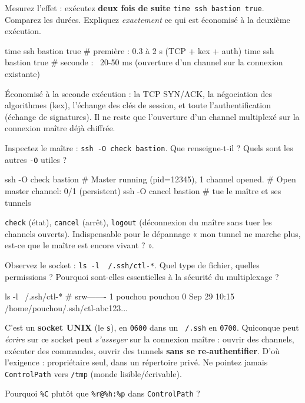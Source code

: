 \documentclass[a4paper,10pt]{exam}
\begin{document}
\begin{questions}
\question Mesurez l'effet : exécutez \textbf{deux fois de suite}
\texttt{time ssh bastion true}. Comparez les durées. Expliquez \emph{exactement} ce qui
est économisé à la deuxième exécution.
\begin{solution}
\begin{bashcode}
time ssh bastion true
# première : 0.3 à 2 s (TCP + kex + auth)
time ssh bastion true
# seconde : ~20-50 ms (ouverture d'un channel sur la connexion existante)
\end{bashcode}
Économisé à la seconde exécution : la TCP SYN/ACK, la négociation des algorithmes
(kex), l'échange des clés de session, et toute l'authentification (échange de
signatures). Il ne reste que l'ouverture d'un channel multiplexé sur la connexion
maître déjà chiffrée.
\end{solution}
\question Inspectez le maître : \texttt{ssh -O check bastion}. Que renseigne-t-il ?
Quels sont les autres \texttt{-O} utiles ?
\begin{solution}
\begin{bashcode}
ssh -O check bastion
# Master running (pid=12345), 1 channel opened.
#  Open master channel: 0/1 (persistent)
ssh -O cancel bastion     # tue le maître et ses tunnels
\end{bashcode}
\texttt{check} (état), \texttt{cancel} (arrêt), \texttt{logout} (déconnexion du maître
sans tuer les channels ouverts). Indispensable pour le dépannage « mon tunnel ne marche
plus, est-ce que le maître est encore vivant ? ».
\end{solution}
\question Observez le socket : \texttt{ls -l ~/.ssh/ctl-*}. Quel type de fichier, quelles
permissions ? Pourquoi sont-elles essentielles à la sécurité du multiplexage ?
\begin{solution}
\begin{bashcode}
ls -l ~/.ssh/ctl-*
# srw------- 1 pouchou pouchou 0 Sep 29 10:15 /home/pouchou/.ssh/ctl-abc123...
\end{bashcode}
C'est un \textbf{socket UNIX} (le \texttt{s}), en \texttt{0600} dans un
\texttt{~/.ssh} en \texttt{0700}. Quiconque peut \emph{écrire} sur ce socket peut
\emph{s'asseyer} sur la connexion maître : ouvrir des channels, exécuter des commandes,
ouvrir des tunnels \textbf{sans se re-authentifier}. D'où l'exigence : propriétaire seul,
dans un répertoire privé. Ne pointez jamais \texttt{ControlPath} vers
\texttt{/tmp} (monde lisible/écrivable).
\end{solution}
\question Pourquoi \texttt{\%C} plutôt que \texttt{\%r@\%h:\%p} dans \texttt{ControlPath} ?

\end{questions}
\end{document}

